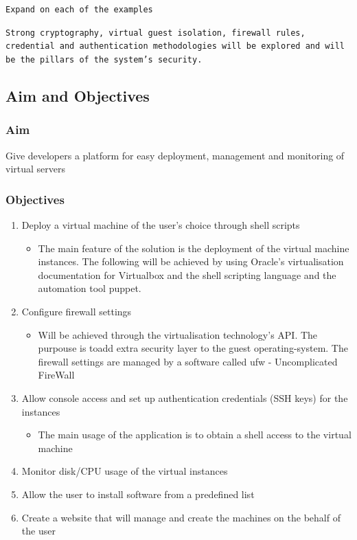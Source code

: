 \documentclass{article}
\begin{document}
\texttt{Expand  on each of the examples}

\texttt{Strong cryptography, virtual guest isolation, firewall rules, credential and authentication methodologies will be explored and will be the pillars of the system's security.}
\subsection{Aim and Objectives}
\subsubsection{Aim}
Give developers a platform for easy deployment, management and monitoring of virtual servers
\subsubsection{Objectives}

\begin{enumerate}
    \item Deploy a virtual machine of the user's choice through shell scripts
          \begin{itemize}
              \item The main feature of the solution is the deployment of the virtual machine instances. The following will be achieved by using Oracle's virtualisation documentation for Virtualbox and the shell scripting language and the automation tool puppet.
          \end{itemize}

    \item Configure firewall settings
          \begin{itemize}
              \item Will be achieved through the virtualisation technology's API. The purpouse is toadd extra security layer to the guest \gls{operating-system}. The firewall settings are managed by a software called ufw - Uncomplicated FireWall
          \end{itemize}

    \item Allow console access and set up authentication credentials (SSH keys) for the instances
          \begin{itemize}
              \item The main usage of the application is to obtain a shell access to the virtual machine
          \end{itemize}
    \item Monitor disk/CPU usage of the virtual instances
    \item Allow the user to install software from a predefined list
    \item Create a website that will manage and create the machines on the behalf of the user
\end{enumerate}
\end{document}
